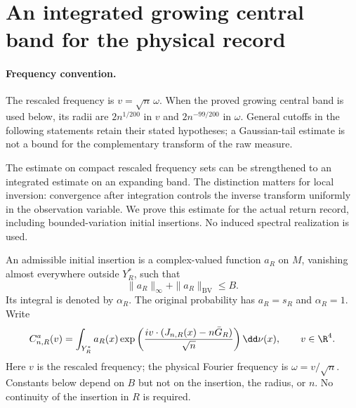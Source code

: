 \section{An integrated growing central band for the physical record}

\paragraph{Frequency convention.}
The rescaled frequency is $v=\sqrt n\,\omega$. When the proved growing
central band is used below, its radii are $2n^{1/200}$ in $v$ and
$2n^{-99/200}$ in $\omega$. General cutoffs in the following statements
retain their stated hypotheses; a Gaussian-tail estimate is not a bound
for the complementary transform of the raw measure.

\label{sec:growing-major-arc}
The estimate on compact rescaled frequency sets can be strengthened to
an integrated estimate on an expanding band. The distinction matters
for local inversion: convergence after integration controls the inverse
transform uniformly in the observation variable. We prove this estimate
for the actual return record, including bounded-variation initial
insertions. No induced spectral realization is used.

An admissible initial insertion is a complex-valued function $a_R$ on
$M$, vanishing almost everywhere outside $Y_R^*$, such that
\[
 \|a_R\|_\infty+\|a_R\|_{\mathrm{BV}}\le B.
\]
Its integral is denoted by $\alpha_R$. The original probability has
$a_R=s_R$ and $\alpha_R=1$. Write
\begin{equation}\label{eq:inserted-central-characteristic}
 C^a_{n,R}(v)=\int_{Y_R^*}a_R(x)
 \exp\left(\frac{i v\cdot(J_{n,R}(x)-n\bar G_R)}{\sqrt n}\right)
 \dd\nu(x),\qquad v\in\R^4.
\end{equation}
Here $v$ is the rescaled frequency; the physical Fourier frequency is
$\omega=v/\sqrt n$. Constants below depend on $B$ but not on the
insertion, the radius, or $n$. No continuity of the insertion in $R$
is required.

